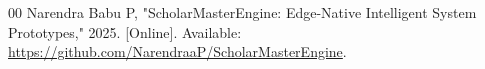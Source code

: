 \documentclass[conference]{IEEEtran}
\begin{document}
\begin{thebibliography}{00}
 Narendra Babu P, "ScholarMasterEngine: Edge-Native Intelligent System Prototypes," 2025. [Online]. Available: \url{https://github.com/NarendraaP/ScholarMasterEngine}.

\end{thebibliography}
\end{document}
